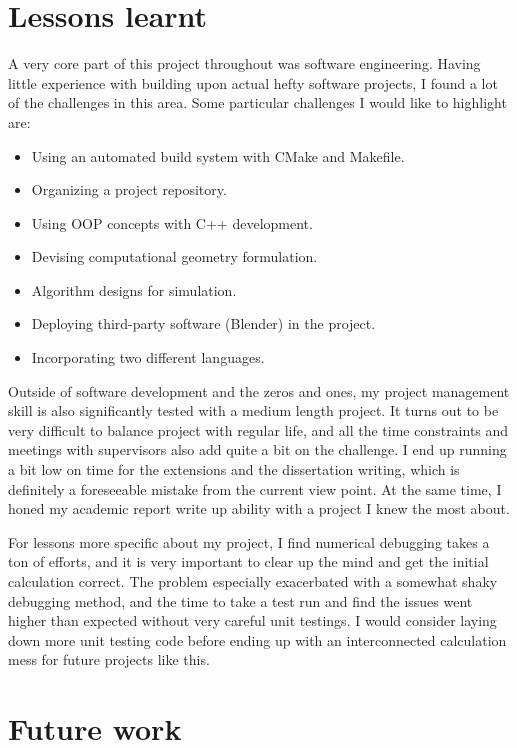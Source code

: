 \documentclass[12pt,a4paper,twoside,openright]{report}
\begin{document}
\section{Lessons learnt}

A very core part of this project throughout was software engineering. Having little experience with building upon actual hefty software projects, I found a lot of the challenges in this area. Some particular challenges I would like to highlight are:
\begin{itemize}
\item Using an automated build system with CMake and Makefile.
\item Organizing a project repository.
\item Using OOP concepts with C++ development.
\item Devising computational geometry formulation.
\item Algorithm designs for simulation.
\item Deploying third-party software (Blender) in the project.
\item Incorporating two different languages.
\end{itemize}

Outside of software development and the zeros and ones, my project management skill is also significantly tested with a medium length project. It turns out to be very difficult to balance project with regular life, and all the time constraints and meetings with supervisors also add quite a bit on the challenge. I end up running a bit low on time for the extensions and the dissertation writing, which is definitely a foreseeable mistake from the current view point. At the same time, I honed my academic report write up ability with a project I knew the most about.

For lessons more specific about my project, I find numerical debugging takes a ton of efforts, and it is very important to clear up the mind and get the initial calculation correct. The problem especially exacerbated with a somewhat shaky debugging method, and the time to take a test run and find the issues went higher than expected without very careful unit testings. I would consider laying down more unit testing code before ending up with an interconnected calculation mess for future projects like this.

\section{Future work}
\end{document}
